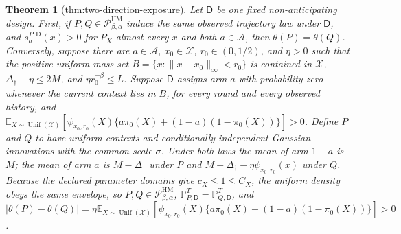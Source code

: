 \documentclass{article}
\newtheorem{theorem}{Theorem}
\begin{document}
\begin{theorem}[thm:two-direction-exposure]\label{thm:two-direction-exposure}
Let \(\mathsf D\) be one fixed non-anticipating design. First, if \(P,Q\in\mathcal P_{\beta,\alpha}^{\mathrm{HM}}\) induce the same observed trajectory law under \(\mathsf D\), and \(s_a^{P,\mathsf D}(x)>0\) for \(P_X\)-almost every \(x\) and both \(a\in\mathcal A\), then \(\theta(P)=\theta(Q)\). Conversely, suppose there are \(a\in\mathcal A\), \(x_0\in\mathcal X\), \(r_0\in(0,1/2)\), and \(\eta>0\) such that the positive-uniform-mass set \(B=\{x:\|x-x_0\|_\infty<r_0\}\) is contained in \(\mathcal X\), \(\Delta_\dagger+\eta\le2M\), and \(\eta r_0^{-\beta}\le L\). Suppose \(\mathsf D\) assigns arm \(a\) with probability zero whenever the current context lies in \(B\), for every round and every observed history, and \(\mathbb E_{X\sim\operatorname{Unif}(\mathcal X)}[\psi_{x_0,r_0}(X)\{a\pi_0(X)+(1-a)(1-\pi_0(X))\}]>0\). Define \(P\) and \(Q\) to have uniform contexts and conditionally independent Gaussian innovations with the common scale \(\sigma\). Under both laws the mean of arm \(1-a\) is \(M\); the mean of arm \(a\) is \(M-\Delta_\dagger\) under \(P\) and \(M-\Delta_\dagger-\eta\psi_{x_0,r_0}(x)\) under \(Q\). Because the declared parameter domains give \(c_X\le1\le C_X\), the uniform density obeys the same envelope, so \(P,Q\in\mathcal P_{\beta,\alpha}^{\mathrm{HM}}\), \(\mathbb P_{P,\mathsf D}^{T}=\mathbb P_{Q,\mathsf D}^{T}\), and \(|\theta(P)-\theta(Q)|=\eta\mathbb E_{X\sim\operatorname{Unif}(\mathcal X)}[\psi_{x_0,r_0}(X)\{a\pi_0(X)+(1-a)(1-\pi_0(X))\}]>0\).
\end{theorem}
\end{document}
